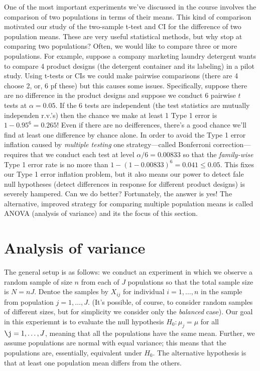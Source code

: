 \documentclass[]{book}
\begin{document}
One of the most important experiments we've discussed in the course
involves the comparison of two populations in terms of their means. This
kind of comparison motivated our study of the two-sample t-test and CI
for the difference of two population means. These are very useful
statistical methods, but why stop at comparing two populations? Often,
we would like to compare three or more populations. For example, suppose
a company marketing laundry detergent wants to compare 4 product designs
(the detergent container and its labeling) in a pilot study. Using
t-tests or CIs we could make pairwise comparisons (there are 4 choose 2,
or, 6 pf these) but this causes some issues. Specifically, suppose there
are no difference in the product designs and suppose we conduct 6
pairwise \(t\) tests at \(\alpha = 0.05\). If the 6 tests are
independent (the test statistics are mutually independen r.v.'s) then
the chance we make at least 1 Type 1 error is \(1-0.95^6 = 0.265\)! Even
if there are no deifferences, there's a good chance we'll find at least
one difference by chance alone. In order to avoid the Type 1 error
inflation caused by \emph{multiple testing} one strategy---called
Bonferroni correction---requires that we conduct each test at level
\(\alpha / 6 = 0.00833\) so that the \emph{family-wise} Type 1 error
rate is no more than \(1-(1-0.00833)^6 = 0.041 \leq 0.05\). This fixes
our Type 1 error inflation problem, but it also means our power to
detect fale null hypotheses (detect differences in response for
different product designs) is severely hampered. Can we do better?
Fortunately, the answer is yes! The alternative, improved strategy for
comparing multiple population means is called ANOVA (analysis of
variance) and its the focus of this section.

\section{Analysis of variance}\label{analysis-of-variance}

The general setup is as follows: we conduct an experiment in which we
observe a random sample of size \(n\) from each of \(J\) populations so
that the total sample size is \(N=nJ\). Dentoe the samples by \(X_{ij}\)
for individual \(i=1, \ldots, n\) in the sample from population
\(j=1,\ldots, J\). (It's possible, of course, to consider random samples
of different sizes, but for simplicity we consider only the
\emph{balanced} case). Our goal in this experiemnt is to evaluate the
null hypothesis \(H_0: \mu_j = \mu\) for all \(\j = 1,\ldots, J\),
meaning that all the populations have the same mean. Further, we assume
populations are normal with equal variance; this means that the
populations are, essentially, equivalent under \(H_0\). The alternative
hypothesis is that at least one population mean differs from the others.
\end{document}
